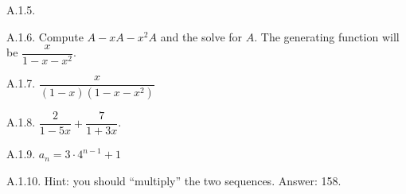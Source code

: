 \begin {itemize}
\begin{ans}{A.1.5.}
\end{ans}
\begin{ans}{A.1.6.}
		Compute $A - xA - x^2A$ and the solve for $A$.  The generating function will be $\dfrac{x}{1-x-x^2}$.  %
	
\end{ans}
\begin{ans}{A.1.7.}
		$\dfrac{x}{(1-x)(1-x-x^2)}$  %
	
\end{ans}
\begin{ans}{A.1.8.}
		$\dfrac{2}{1-5x} + \dfrac{7}{1+3x}$.  %
	
\end{ans}
\begin{ans}{A.1.9.}
		$a_n = 3\cdot 4^{n-1} + 1$  %
	
\end{ans}
\begin{ans}{A.1.10.}
		Hint: you should ``multiply'' the two sequences.  Answer: 158.  %
	
\end{ans}
\protect \end {itemize}
